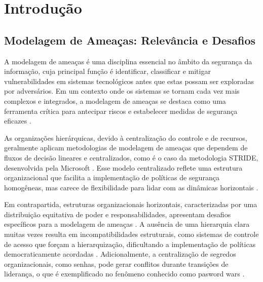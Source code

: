 
%

%

\chapter{Introdução}
\label{cha:Introduction}


\section{Modelagem de Ameaças: Relevância e Desafios}
\label{sec:modelagem_ameacas}

A modelagem de ameaças é uma disciplina essencial no âmbito da segurança da
informação, cuja principal função é identificar, classificar e mitigar
vulnerabilidades em sistemas tecnológicos antes que estas possam ser exploradas
por adversários. Em um contexto onde os sistemas se tornam cada vez mais
complexos e integrados, a modelagem de ameaças se destaca como uma ferramenta
crítica para antecipar riscos e estabelecer medidas de segurança eficazes
\cite{ThreatModellingSurvey}.

As organizações hierárquicas, devido à centralização do controle e de recursos,
geralmente aplicam metodologias de modelagem de ameaças que dependem de fluxos
de decisão lineares e centralizados, como é o caso da metodologia STRIDE,
desenvolvida pela Microsoft \cite{ThreatModelingASummaryOfAvailableMethods}.
Esse modelo centralizado reflete uma estrutura organizacional que facilita a
implementação de políticas de segurança homogêneas, mas carece de flexibilidade
para lidar com as dinâmicas horizontais
\cite{EvaluationofCompetingThreatModeling}.

Em contrapartida, estruturas organizacionais horizontais, caracterizadas por uma
distribuição equitativa de poder e responsabilidades, apresentam desafios
específicos para a modelagem de ameaças \cite{Colbac}. A ausência de uma
hierarquia clara muitas vezes resulta em incompatibilidades estruturais, como
sistemas de controle de acesso que forçam a hierarquização, dificultando a
implementação de políticas democraticamente acordadas \cite{Colbac}.
Adicionalmente, a centralização de segredos organizacionais, como senhas, pode
gerar conflitos durante transições de liderança, o que é exemplificado no
fenômeno conhecido como pasword wars \cite{FromCounterpublicstoContentious}.


